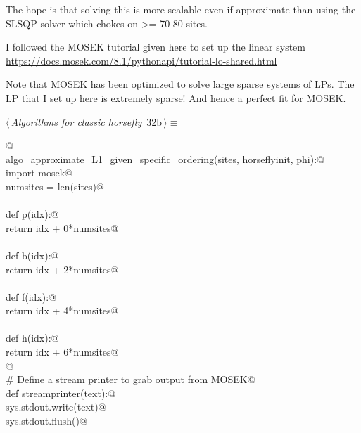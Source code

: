 \documentclass[11.5pt]{report}
\begin{document}
The hope is that solving this is more scalable even if approximate
than using the SLSQP solver which chokes on >= 70-80 sites. 
    
I followed the MOSEK tutorial given here to set up the linear system
\url{https://docs.mosek.com/8.1/pythonapi/tutorial-lo-shared.html}
    
Note that MOSEK has been optimized to solve large \underline{sparse} systems of LPs. 
The LP that I set up here is extremely sparse! And hence a perfect fit 
for MOSEK. 


\begin{flushleft} \small\label{scrap45}\raggedright\small
{} $\langle\,${\itshape Algorithms for classic horsefly}\nobreak\ {\footnotesize {32b}}$\,\rangle\equiv$
\vspace{-1ex}
\begin{list}{}{} \item
\mbox{}\verb@ @\\
\mbox{}\verb@def  algo_approximate_L1_given_specific_ordering(sites, horseflyinit, phi):@\\
\mbox{}\verb@    import mosek@\\
\mbox{}\verb@    numsites = len(sites)@\\
\mbox{}\verb@@\\
\mbox{}\verb@    def p(idx):@\\
\mbox{}\verb@        return idx + 0*numsites@\\
\mbox{}\verb@@\\
\mbox{}\verb@    def b(idx):@\\
\mbox{}\verb@        return idx + 2*numsites@\\
\mbox{}\verb@@\\
\mbox{}\verb@    def f(idx):@\\
\mbox{}\verb@        return idx + 4*numsites@\\
\mbox{}\verb@@\\
\mbox{}\verb@    def h(idx):@\\
\mbox{}\verb@        return idx + 6*numsites@\\
\mbox{}\verb@    @\\
\mbox{}\verb@    # Define a stream printer to grab output from MOSEK@\\
\mbox{}\verb@    def streamprinter(text):@\\
\mbox{}\verb@        sys.stdout.write(text)@\\
\mbox{}\verb@        sys.stdout.flush()@\\

\end{list}
\end{flushleft}
\end{document}
